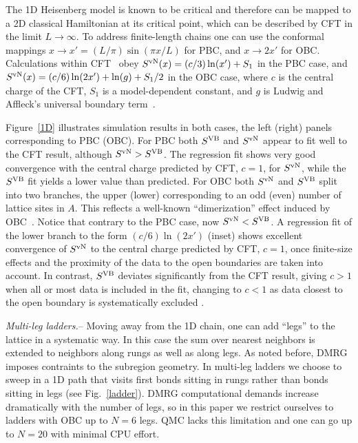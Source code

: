 \documentclass[prl,aps,twocolumn,floatfix,amsmath,amssymb,superscriptaddress,tightenlines]{revtex4}
\begin{document}
The 1D Heisenberg model is known to be critical and therefore can be
mapped to a 2D classical Hamiltonian at its critical point, which
can be described by CFT in the limit $L\to\infty$.  To address
finite-length chains one can use the conformal mappings $x\to x'=(L/\pi)
\sin(\pi x / L)$ for PBC, and 
$x\to 2x'$ for OBC. %
Calculations within CFT~\cite{Cardy} obey $S^{\rm vN}(x)= (c/3)
\ln(x') + S_1$ in the PBC case, and $S^{\rm vN}(x)= (c/6) \ln(2x') +
\ln(g)+S_1/2$ in the OBC case, where $c$ is the central charge of the CFT,
$S_1$ is a model-dependent constant, and $g$ is Ludwig and Affleck's
universal boundary term~\cite{AffleckAndLudwig}.

Figure~\ref{1D} illustrates simulation results in both cases, the left
(right) panels corresponding to PBC (OBC). 
For PBC both
$S^{\rm VB}$ and $S^{ \rm vN}$ appear to fit well to the CFT result, although
$S^{ \rm vN} > S^{\rm VB}$. The regression fit shows very good
convergence with the central charge predicted by CFT, $c=1$, for $S^{ \rm vN}$, while
the $S^{\rm VB}$ fit yields a lower value than predicted.
For OBC both $S^{ \rm vN}$ and $S^{\rm VB}$ split into two branches, the upper (lower)
corresponding to an odd (even) number of lattice sites in $A$.  This
reflects a well-known ``dimerization'' effect induced by OBC~\cite{Ian1}.
Notice that contrary to the PBC case, now $S^{ \rm vN} < S^{\rm VB}$. 
A regression fit of the lower branch to the form $(c/6) \ln
({2x'})$ (inset) shows excellent convergence of $S^{ \rm vN}$ to the central
charge predicted by CFT, $c=1$, once finite-size effects and the proximity
of the data to the open boundaries are taken into account.  In contrast,
 $S^{\rm VB}$ deviates significantly from the CFT result, giving 
$c>1$ when all or most data is included in the fit, changing to $c<1$
as data closest to the open boundary is systematically excluded \cite{XXX}.

{\it Multi-leg ladders.}-- Moving away from the 1D chain, one can add
``legs'' to the lattice in a systematic way. In this case the sum over
nearest neighbors is extended to neighbors along rungs as well as along
legs.  As noted before, DMRG imposes contraints to the subregion
geometry. In multi-leg ladders we choose to sweep in a 1D path that visits
first bonds sitting in rungs rather than bonds sitting in legs (see
Fig.~\ref{ladder}).  DMRG computational demands increase dramatically with
the number of legs, so in this paper we restrict ourselves to ladders with
OBC up to $N=6$ legs. QMC lacks this limitation and one can go up to
$N=20$ with minimal CPU effort.
\end{document}
